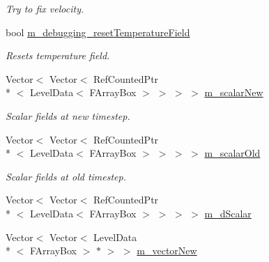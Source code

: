 \begin{DoxyCompactItemize}
\begin{DoxyCompactList}\small\item\em Try to fix velocity. \end{DoxyCompactList}\item 
\hypertarget{classamr_mushy_layer_a379c51006aa273452e2fca1e3885a978}{bool \hyperlink{classamr_mushy_layer_a379c51006aa273452e2fca1e3885a978}{m\-\_\-debugging\-\_\-reset\-Temperature\-Field}}\label{classamr_mushy_layer_a379c51006aa273452e2fca1e3885a978}

\begin{DoxyCompactList}\small\item\em Resets temperature field. \end{DoxyCompactList}\item 
\hypertarget{classamr_mushy_layer_a369d5b85d71b36bc64b579762828c292}{Vector$<$ Vector$<$ Ref\-Counted\-Ptr\\*
$<$ Level\-Data$<$ F\-Array\-Box $>$ $>$ $>$ $>$ \hyperlink{classamr_mushy_layer_a369d5b85d71b36bc64b579762828c292}{m\-\_\-scalar\-New}}\label{classamr_mushy_layer_a369d5b85d71b36bc64b579762828c292}

\begin{DoxyCompactList}\small\item\em Scalar fields at new timestep. \end{DoxyCompactList}\item 
\hypertarget{classamr_mushy_layer_ad8c87eac8ca68c057dc63380bdd88c36}{Vector$<$ Vector$<$ Ref\-Counted\-Ptr\\*
$<$ Level\-Data$<$ F\-Array\-Box $>$ $>$ $>$ $>$ \hyperlink{classamr_mushy_layer_ad8c87eac8ca68c057dc63380bdd88c36}{m\-\_\-scalar\-Old}}\label{classamr_mushy_layer_ad8c87eac8ca68c057dc63380bdd88c36}

\begin{DoxyCompactList}\small\item\em Scalar fields at old timestep. \end{DoxyCompactList}\item 
Vector$<$ Vector$<$ Ref\-Counted\-Ptr\\*
$<$ Level\-Data$<$ F\-Array\-Box $>$ $>$ $>$ $>$ \hyperlink{classamr_mushy_layer_af1edd977e248b432f8395bd9c8e8af4f}{m\-\_\-d\-Scalar}
\item 
\hypertarget{classamr_mushy_layer_a5979c77b59295ecd5219b30b97c446ab}{Vector$<$ Vector$<$ Level\-Data\\*
$<$ F\-Array\-Box $>$ $\ast$ $>$ $>$ \hyperlink{classamr_mushy_layer_a5979c77b59295ecd5219b30b97c446ab}{m\-\_\-vector\-New}}\label{classamr_mushy_layer_a5979c77b59295ecd5219b30b97c446ab}


\end{DoxyCompactItemize}
